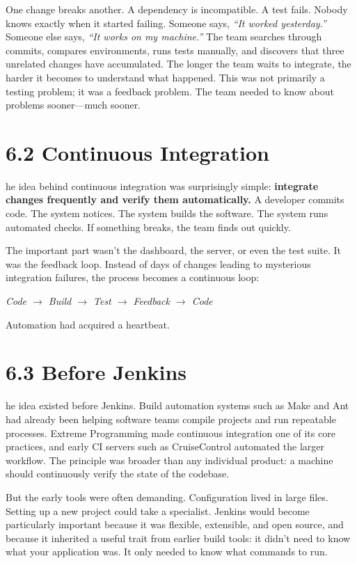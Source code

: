 \documentclass[11pt, a4paper, openany]{book}
\newcommand{\initialcap}[1]{{\fontfamily{lmss}\selectfont\huge\textbf{#1}}}
\begin{document}
\noindent One change breaks another. A dependency is incompatible. A test fails. Nobody knows exactly when it started failing. Someone says, \textit{``It worked yesterday.''} Someone else says, \textit{``It works on my machine.''} The team searches through commits, compares environments, runs tests manually, and discovers that three unrelated changes have accumulated. The longer the team waits to integrate, the harder it becomes to understand what happened. This was not primarily a testing problem; it was a feedback problem. The team needed to know about problems sooner---much sooner.

\section{6.2 Continuous Integration}
\noindent \initialcap{T}he idea behind continuous integration was surprisingly simple: \textbf{integrate changes frequently and verify them automatically.} A developer commits code. The system notices. The system builds the software. The system runs automated checks. If something breaks, the team finds out quickly.

\noindent The important part wasn't the dashboard, the server, or even the test suite. It was the feedback loop. Instead of days of changes leading to mysterious integration failures, the process becomes a continuous loop:
\begin{center}
\textit{Code $\rightarrow$ Build $\rightarrow$ Test $\rightarrow$ Feedback $\rightarrow$ Code}
\end{center}
Automation had acquired a heartbeat.

\section{6.3 Before Jenkins}
\noindent \initialcap{T}he idea existed before Jenkins. Build automation systems such as Make and Ant had already been helping software teams compile projects and run repeatable processes. Extreme Programming made continuous integration one of its core practices, and early CI servers such as CruiseControl automated the larger workflow. The principle was broader than any individual product: a machine should continuously verify the state of the codebase.

\noindent But the early tools were often demanding. Configuration lived in large files. Setting up a new project could take a specialist. Jenkins would become particularly important because it was flexible, extensible, and open source, and because it inherited a useful trait from earlier build tools: it didn't need to know what your application was. It only needed to know what commands to run.
\end{document}
